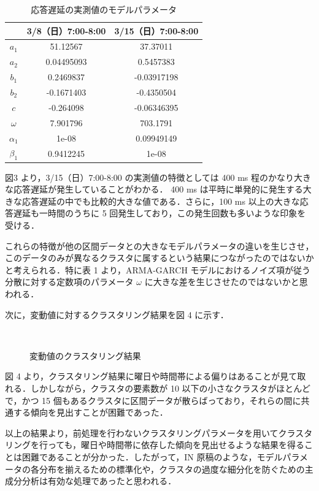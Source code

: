 \documentclass[a4j]{jarticle}
\begin{document}
\begin{table}[tb]
\centering
\caption{応答遅延の実測値のモデルパラメータ}
\begin{tabular}{|c|c|c|}
\hline
& 3/8（日）7:00-8:00& 3/15（日）7:00-8:00\\
\hline
$a_1$&51.12567&37.37011\\
\hline
$a_2$&0.04495093&0.5457383\\
\hline
$b_1$&0.2469837&-0.03917198\\
\hline
$b_2$&-0.1671403&-0.4350504\\
\hline
$c$&-0.264098&-0.06346395\\
\hline
$\omega$&7.901796&703.1791\\
\hline
$\alpha_1$&1e-08&0.09949149\\
\hline
$\beta_1$&0.9412245&1e-08\\
\hline
\end{tabular}
\end{table}
図3 より，3/15（日）7:00-8:00 の実測値の特徴としては 400 ms 程のかなり大きな応答遅延が発生していることがわかる． 400 ms は平時に単発的に発生する大きな応答遅延の中でも比較的大きな値である．さらに，100 ms 以上の大きな応答遅延も一時間のうちに 5 回発生しており，この発生回数も多いような印象を受ける．

これらの特徴が他の区間データとの大きなモデルパラメータの違いを生じさせ，このデータのみが異なるクラスタに属するという結果につながったのではないかと考えられる．特に表 1 より，ARMA-GARCH モデルにおけるノイズ項が従う分散に対する定数項のパラメータ $\omega$ に大きな差を生じさせたのではないかと思われる．

次に，変動値に対するクラスタリング結果を図 4 に示す．
\begin{figure}[tb]
\begin{center}
~
\\
\caption{変動値のクラスタリング結果}
\label{norm}
\end{center}
\end{figure}
図 4 より，クラスタリング結果に曜日や時間帯による偏りはあることが見て取れる．しかしながら，クラスタの要素数が 10 以下の小さなクラスタがほとんどで，かつ 15 個もあるクラスタに区間データが散らばっており，それらの間に共通する傾向を見出すことが困難であった．

以上の結果より，前処理を行わないクラスタリングパラメータを用いてクラスタリングを行っても，曜日や時間帯に依存した傾向を見出せるような結果を得ることは困難であることが分かった．したがって，IN 原稿のような，モデルパラメータの各分布を揃えるための標準化や，クラスタの過度な細分化を防ぐための主成分分析は有効な処理であったと思われる．
\end{document}
